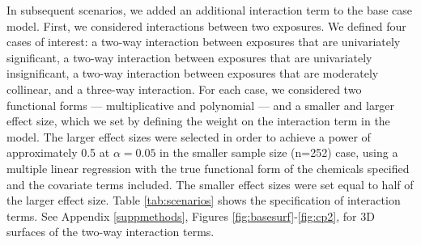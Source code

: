\documentclass[12pt, twoside]{amherstthesis}
\begin{document}
In subsequent scenarios, we added an additional interaction term to the base case model. First, we considered interactions between two exposures. We defined four cases of interest: a two-way interaction between exposures that are univariately significant, a two-way interaction between exposures that are univariately insignificant, a two-way interaction between exposures that are moderately collinear, and a three-way interaction. For each case, we considered two functional forms --- multiplicative and polynomial --- and a smaller and larger effect size, which we set by defining the weight on the interaction term in the model. The larger effect sizes were selected in order to achieve a power of approximately 0.5 at \(\alpha=0.05\) in the smaller sample size (n=252) case, using a multiple linear regression with the true functional form of the chemicals specified and the covariate terms included. The smaller effect sizes were set equal to half of the larger effect size. Table \ref{tab:scenarios} shows the specification of interaction terms. See Appendix \ref{suppmethods}, Figures \ref{fig:basesurf}-\ref{fig:cp2}, for 3D surfaces of the two-way interaction terms.
\end{document}
